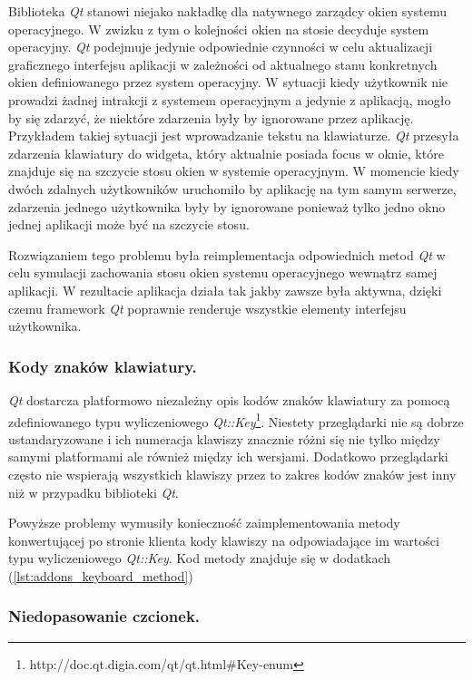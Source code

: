 Biblioteka \emph{Qt} stanowi niejako nakładkę dla natywnego zarządcy okien systemu operacyjnego. W zwizku z tym o kolejności okien na stosie decyduje system operacyjny. \emph{Qt} podejmuje jedynie odpowiednie czynności w celu aktualizacji graficznego interfejsu aplikacji w zależności od aktualnego stanu konkretnych okien definiowanego przez system operacyjny. W sytuacji kiedy użytkownik nie prowadzi żadnej intrakcji z systemem operacyjnym a jedynie z aplikacją, mogło by się zdarzyć, że niektóre zdarzenia były by ignorowane przez aplikację. Przykładem takiej sytuacji jest wprowadzanie tekstu na klawiaturze. \emph{Qt} przesyła zdarzenia klawiatury do widgeta, który aktualnie posiada focus w oknie, które znajduje się na szczycie stosu okien w systemie operacyjnym. W momencie kiedy dwóch zdalnych użytkowników uruchomiło by aplikację na tym samym serwerze, zdarzenia jednego użytkownika były by ignorowane ponieważ tylko jedno okno jednej aplikacji może być na szczycie stosu. 

Rozwiązaniem tego problemu była reimplementacja odpowiednich metod \emph{Qt} w celu symulacji zachowania stosu okien systemu operacyjnego wewnątrz samej aplikacji. W rezultacie aplikacja działa tak jakby zawsze była aktywna, dzięki czemu framework \emph{Qt} poprawnie renderuje wszystkie elementy interfejsu użytkownika.

\subsubsection{Kody znaków klawiatury.}
\label{problems_keyboard}

\emph{Qt} dostarcza platformowo niezależny opis kodów znaków klawiatury za pomocą zdefiniowanego typu wyliczeniowego \emph{Qt::Key}\footnote{http://doc.qt.digia.com/qt/qt.html\#Key-enum}. Niestety przeglądarki nie są dobrze ustandaryzowane i ich numeracja klawiszy znacznie różni się nie tylko między samymi platformami ale również między ich wersjami. Dodatkowo przeglądarki często nie wspierają wszystkich klawiszy przez to zakres kodów znaków jest inny niż w przypadku biblioteki \emph{Qt}.

Powyższe problemy wymusiły konieczność zaimplementowania metody konwertującej po stronie klienta kody klawiszy na odpowiadające im wartości typu wyliczeniowego \emph{Qt::Key}. Kod metody znajduje się w dodatkach (\ref{lst:addons_keyboard_method})

\subsubsection{Niedopasowanie czcionek.}
\label{problems_fonts}

